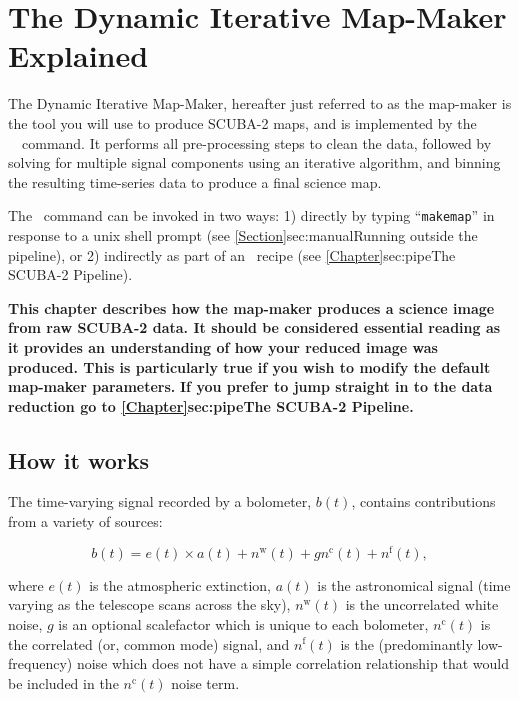 \chapter{The Dynamic Iterative Map-Maker Explained}
\label{sec:dimm}

The Dynamic Iterative Map-Maker, hereafter just referred to as the
map-maker is the tool you will use to produce SCUBA-2 maps, and is
implemented by the \smurf\ \makemap\ command. It performs
all pre-processing steps to clean the data, followed by solving for
multiple signal components using an iterative algorithm, and binning
the resulting time-series data to produce a final science map.

The \makemap\ command can be invoked in two ways: 1) directly by typing
``\texttt{makemap}'' in response to a unix shell prompt (see
\cref{Section}{sec:manual}{Running  outside the pipeline}), or 2)
indirectly as part of an \oracdr\ recipe (see
\cref{Chapter}{sec:pipe}{The SCUBA-2 Pipeline}).

\textbf{This chapter describes how the map-maker produces a science image
from raw SCUBA-2 data. It should be considered essential reading as it
provides an understanding of how your reduced image was produced. This is
particularly true if you wish to modify the default map-maker parameters.}
\color{red}\textbf{ If you prefer to jump straight in to the data reduction go
to \cref{Chapter}{sec:pipe}{The SCUBA-2 Pipeline}.}\color{black}


\section{How it works}

The time-varying signal recorded by a bolometer, $b(t)$, contains
contributions from a variety of sources:

\begin{equation}
\label{eq:bolsig}
b(t) = e(t) \times a(t) + n^{\textrm{w}}(t) + gn^{\textrm{c}}(t) + n^{\textrm{f}}(t),
\end{equation}

where $e(t)$ is the atmospheric extinction, $a(t)$ is the astronomical
signal (time varying as the telescope scans across the sky),
$n^{\textrm{w}}(t)$ is the uncorrelated white noise, $g$ is an
optional scalefactor which is unique to each bolometer,
$n^{\textrm{c}}(t)$ is the correlated (or, common mode) signal, and
$n^{\textrm{f}}(t)$ is the (predominantly low-frequency) noise which
does not have a simple correlation relationship that would be included
in the $n^{\textrm{c}}(t)$ noise term.


